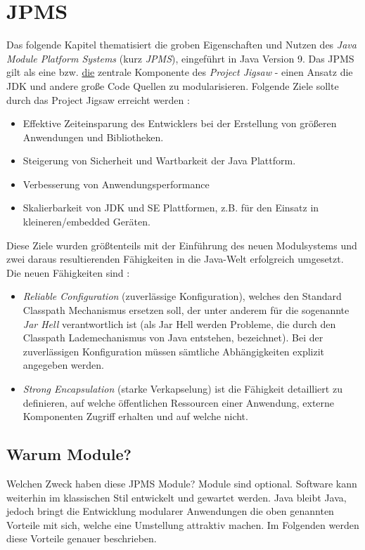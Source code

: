 
\section{JPMS}
\label{ch-jpms}

Das folgende Kapitel thematisiert die groben Eigenschaften und Nutzen des \textit{Java Module Platform Systems} (kurz \textit{JPMS}), eingeführt in Java Version 9. 
Das JPMS gilt als eine bzw. \underline{die} zentrale Komponente des \textit{Project Jigsaw} - einen Ansatz die JDK und andere große Code Quellen zu modularisieren. 
Folgende Ziele sollte durch das Project Jigsaw erreicht werden \cite{project-jigsaw}:

\begin{itemize} [noitemsep]
	\item Effektive Zeiteinsparung des Entwicklers bei der Erstellung von größeren Anwendungen und Bibliotheken.
	\item Steigerung von Sicherheit und Wartbarkeit der Java Plattform.
	\item Verbesserung von Anwendungsperformance
	\item Skalierbarkeit von JDK und SE Plattformen, z.B. für den Einsatz in kleineren/embedded Geräten.
\end{itemize}

Diese Ziele wurden größtenteils mit der Einführung des neuen Modulsystems und zwei daraus resultierenden Fähigkeiten in die Java-Welt erfolgreich umgesetzt.
Die neuen Fähigkeiten sind \cite{jpms-spec}:

\begin{itemize}
	\item \textit{Reliable Configuration} (zuverlässige Konfiguration), welches den Standard Classpath Mechanismus ersetzen soll, der unter anderem für die sogenannte \textit{Jar Hell} verantwortlich ist (als Jar Hell werden Probleme, die durch den Classpath Lademechanismus von Java entstehen, bezeichnet). 
	Bei der zuverlässigen Konfiguration müssen sämtliche Abhängigkeiten explizit angegeben werden.
	\item \textit{Strong Encapsulation} (starke Verkapselung) ist die Fähigkeit detailliert zu definieren, auf welche öffentlichen Ressourcen einer Anwendung, externe Komponenten Zugriff erhalten und auf welche nicht.
\end{itemize}

\subsection{Warum Module?}
Welchen Zweck haben diese JPMS Module? Module sind optional. 
Software kann weiterhin im klassischen Stil entwickelt und gewartet werden. 
Java bleibt Java, jedoch bringt die Entwicklung modularer Anwendungen die oben genannten Vorteile mit sich, welche eine Umstellung attraktiv machen.
Im Folgenden werden diese Vorteile genauer beschrieben.

